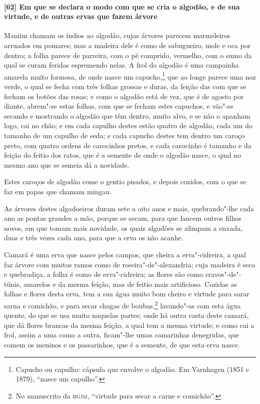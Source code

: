 \begin{linenumbers}
\paragraph{[62] Em que se declara o modo com que se cria o algodão, e de sua virtude, e de
outras ervas que fazem árvore}\quad
Maniim chamam os índios ao algodão, cujas árvores parecem marmeleiros arruados em pomares;
mas a madeira dele é como de sabugueiro, mole e oca por dentro; a folha parece de
parreira, com o pé comprido, vermelho, com o sumo da qual se curam feridas espremendo
nelas. A frol do algodão é uma campainha amarela muito formosa, de onde nasce um
capucho,\footnote{ Capucho ou capulho: cápsula que envolve o algodão. 
Em Varnhagen (1851 e 1879), ``nasce um capulho''.} que ao longe parece
uma noz verde, o qual se fecha com três folhas grossas e duras, da feição das com que se
fecham os botões das rosas; e como o algodão está de vez, que é de agosto por diante,
abrem"-se estas folhas, com que se fecham estes capuchos, e vão"-se secando e mostrando o
algodão que têm dentro, muito alvo, e se não o apanham logo, cai no chão; e em cada
capulho destes estão quatro de algodão, cada um do tamanho de um capulho de seda; e cada
capucho destes tem dentro um caroço preto, com quatro ordens de carocinhos pretos, e cada
carocinho é tamanho e da feição do feitio dos ratos, que é a semente de onde o algodão
nasce, o qual no mesmo ano que se semeia dá a novidade.

Estes caroços de algodão come o gentio pisados, e depois cozidos, com o que se faz em
papas que chamam mingau.

As árvores destes algodoeiros duram sete a oito anos e mais, quebrando"-lhe cada ano as
pontas grandes a mão, porque se secam, para que lancem outros filhos novos, em que tomam
mais novidade, os quais algodões se alimpam a enxada, duas e três vezes cada ano, para que
a erva os não acanhe.

Camará é uma erva que nasce pelos campos, que cheira a erva"-cidreira, a qual faz árvore
com muitos ramos como de roseira"-de"-alexandria; cuja madeira é seca e quebradiça, a folha
é como de erva"-cidreira; as flores são como cravos"-de"-túnis, amarelos e da mesma feição,
mas de feitio mais artificioso. Cozidas as folhas e flores desta erva, tem a sua água
muito bom cheiro e virtude para sarar sarna e comichão, e para secar chagas de
boubas,\footnote{ No manuscrito da \textsc{bgjm}, ``virtude para secar a carne e
comichão''.} lavando"-as com esta água quente, do que se usa muito naquelas partes; onde há
outra casta deste camará, que dá flores brancas da mesma feição, a qual tem a mesma
virtude; e como cai a frol, assim a uma como a outra, ficam"-lhe umas camarinhas
denegridas, que comem os meninos e os passarinhos, que é a semente, de que esta erva
nasce.


\end{linenumbers}
